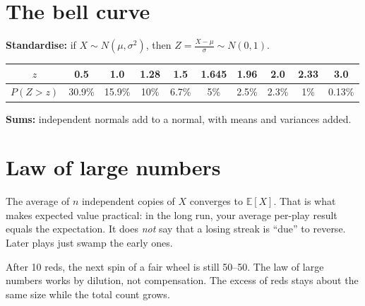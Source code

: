 \documentclass[11pt,a4paper,openany]{report}
\newcommand{\E}{\mathbb{E}}
\begin{document}
\section{The bell curve}
\begin{center}
\end{center}
\textbf{Standardise:} if $X\sim N(\mu,\sigma^2)$, then $Z=\frac{X-\mu}\sigma\sim N(0,1)$.

\begin{center}\small
\begin{tabular}{c|ccccccccc}
\toprule
$z$ & 0.5 & 1.0 & 1.28 & 1.5 & 1.645 & 1.96 & 2.0 & 2.33 & 3.0\\\midrule
$P(Z>z)$ & 30.9\% & 15.9\% & 10\% & 6.7\% & 5\% & 2.5\% & 2.3\% & 1\% & 0.13\%\\
\bottomrule
\end{tabular}
\end{center}
\textbf{Sums:} independent normals add to a normal, with means and variances added.

\section{Law of large numbers}
The average of $n$ independent copies of $X$ converges to $\E[X]$. That is what makes expected value practical: in the long run, your average per-play result equals the expectation. It does \emph{not} say that a losing streak is ``due'' to reverse. Later plays just swamp the early ones.

\begin{trap}
After 10 reds, the next spin of a fair wheel is still 50--50. The law of large numbers works by dilution, not compensation. The excess of reds stays about the same size while the total count grows.
\end{trap}
\end{document}
